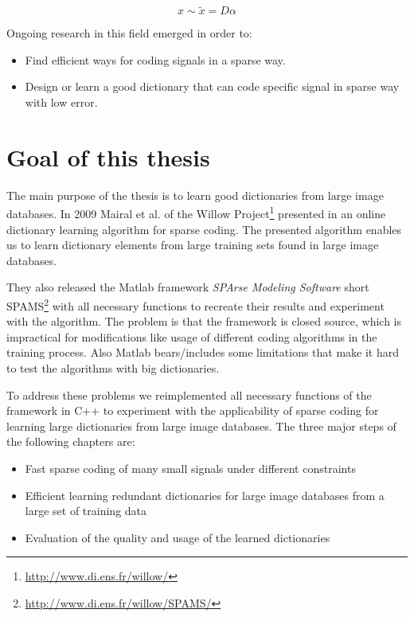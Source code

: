 \begin{equation}
 x \sim \tilde{x} = D\alpha
\end{equation}



Ongoing research in this field emerged in order to:
\begin{itemize}
 \item Find efficient ways for coding signals in a sparse way.
 \item Design or learn a good dictionary that can code specific signal in sparse
way with low error.
\end{itemize}


\section{Goal of this thesis}
The main purpose of the thesis is to learn good dictionaries from large
image databases. %
In 2009 Mairal et al. of the Willow
Project\footnote{\url{http://www.di.ens.fr/willow/}} presented in
\cite{Mairal2009,Mairal2010} an online dictionary learning algorithm for sparse
coding. The presented algorithm enables us to learn dictionary elements from
large training sets found in large image databases.

They also released the Matlab framework \emph{SPArse Modeling Software}
short SPAMS\footnote{\url{http://www.di.ens.fr/willow/SPAMS/}} with all
necessary functions to recreate their results and experiment with the algorithm.
The problem is that the framework is closed source, which is impractical for
modifications like usage of different coding algorithms in the training process.
Also Matlab bears/includes some limitations that make it hard to test the
algorithms with big dictionaries.

To address these problems we reimplemented all necessary functions of the
framework in C++ to experiment with the applicability of sparse coding for
learning large dictionaries from large image databases. The three major steps of
the following chapters are:

\begin{itemize}
 \item Fast sparse coding of many small signals under different constraints
 \item Efficient learning redundant dictionaries for large image databases from
a large set of training data
 \item Evaluation of the quality and usage of the learned dictionaries
\end{itemize}

